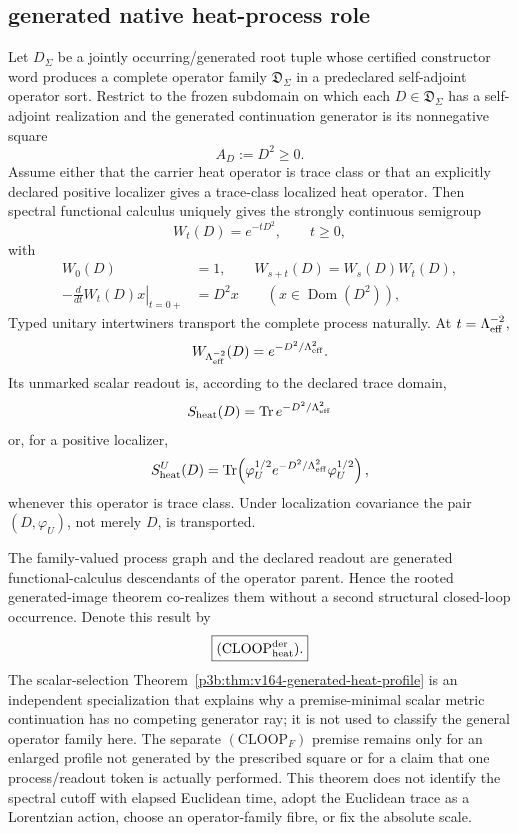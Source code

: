 \documentclass[12pt,a4paper]{article}
\begin{document}
\subsection{generated native heat-process role}
\label{p3b:sec:v173-joint-heat-process}

\begin{theorem}
\label{p3b:thm:v173-joint-heat-process-corealization}
Let \(D_\Sigma\) be a jointly occurring/generated root tuple whose certified
constructor word produces a complete operator family \(\mathfrak D_\Sigma\)
in a predeclared self-adjoint operator sort.  Restrict to the frozen subdomain
on which each \(D\in\mathfrak D_\Sigma\) has a self-adjoint realization and
the generated continuation generator is its nonnegative square
\[
 A_D:=D^2\ge0.
\]
Assume either that the carrier heat operator is trace class or that an
explicitly declared positive localizer gives a trace-class localized heat
operator.  Then spectral functional calculus uniquely gives the strongly
continuous semigroup
\[
 \boxed{W_t(D)=e^{-tD^2}},\qquad t\ge0,
\]
with
\[
 \begin{aligned}
 W_0(D)&=1,\qquad W_{s+t}(D)=W_s(D)W_t(D),\\
 -\left.\frac{d}{dt}W_t(D)x\right|_{t=0+}&=D^2x
 \qquad(x\in\operatorname{Dom}(D^2)),
 \end{aligned}
\]
Typed unitary intertwiners transport the complete process naturally.  At
\(t=\Lambda_{\rm eff}^{-2}\),
\[
 W_{\Lambda_{\rm eff}^{-2}}(D)
 =e^{-D^2/\Lambda_{\rm eff}^{2}}.
\]
Its unmarked scalar readout is, according to the declared trace domain,
\[
 S_{\rm heat}(D)=\operatorname{Tr}e^{-D^2/\Lambda_{\rm eff}^{2}}
\]
or, for a positive localizer,
\[
 S_{\rm heat}^{U}(D)=
 \operatorname{Tr}\!\left(
 \varphi_U^{1/2}e^{-D^2/\Lambda_{\rm eff}^{2}}\varphi_U^{1/2}
 \right),
\]
whenever this operator is trace class.  Under localization covariance the
pair \((D,\varphi_U)\), not merely \(D\), is transported.

The family-valued process graph and the declared readout are generated
functional-calculus descendants of the operator parent.  Hence the rooted
generated-image theorem co-realizes them without a second structural
closed-loop occurrence.  Denote this result by
\[
 \boxed{(\mathrm{CLOOP}_{\rm heat}^{\rm der}).}
\]
The scalar-selection Theorem~\ref{p3b:thm:v164-generated-heat-profile} is an
independent specialization that explains why a premise-minimal scalar metric
continuation has no competing generator ray; it is not used to classify the
general operator family here.  The separate \((\mathrm{CLOOP}_F)\) premise
remains only for an enlarged profile not generated by the prescribed square
or for a claim that one process/readout token is actually performed.  This
theorem does not identify the spectral cutoff with elapsed Euclidean time,
adopt the Euclidean trace as a Lorentzian action, choose an operator-family
fibre, or fix the absolute scale.
\end{theorem}
\end{document}
